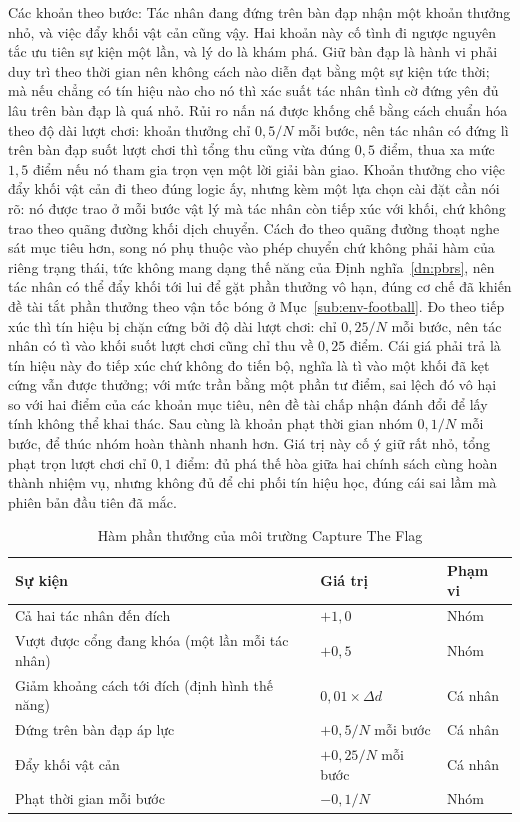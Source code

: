 \indent Các khoản theo bước: Tác nhân đang đứng trên bàn đạp nhận một khoản
thưởng nhỏ, và việc đẩy khối vật cản cũng vậy. Hai khoản này cố tình đi ngược nguyên tắc
ưu tiên sự kiện một lần, và lý do là khám phá. Giữ bàn đạp là hành vi phải duy trì theo
thời gian nên không cách nào diễn đạt bằng một sự kiện tức thời; mà nếu chẳng có tín hiệu
nào cho nó thì xác suất tác nhân tình cờ đứng yên đủ lâu trên bàn đạp là quá nhỏ. Rủi ro
nấn ná được khống chế bằng cách chuẩn hóa theo độ dài lượt chơi: khoản thưởng chỉ $0{,}5/N$
mỗi bước, nên tác nhân có đứng lì trên bàn đạp suốt lượt chơi thì tổng thu cũng vừa đúng
$0{,}5$ điểm, thua xa mức $1{,}5$ điểm nếu nó tham gia trọn vẹn một lời giải bàn giao.
Khoản thưởng cho việc đẩy khối vật cản đi theo đúng logic ấy, nhưng kèm một lựa chọn cài
đặt cần nói rõ: nó được trao ở mỗi bước vật lý mà tác nhân còn tiếp xúc với khối, chứ
không trao theo quãng đường khối dịch chuyển. Cách đo theo quãng đường thoạt nghe sát mục
tiêu hơn, song nó phụ thuộc vào phép chuyển chứ không phải hàm của riêng trạng thái, tức
không mang dạng thế năng của Định nghĩa~\ref{dn:pbrs}, nên tác nhân có thể đẩy khối tới
lui để gặt phần thưởng vô hạn, đúng cơ chế đã khiến đề tài tắt phần thưởng theo vận tốc
bóng ở Mục~\ref{sub:env-football}. Đo theo tiếp xúc thì tín hiệu bị chặn cứng bởi độ dài
lượt chơi: chỉ $0{,}25/N$ mỗi bước, nên tác nhân có tì vào khối suốt lượt chơi cũng chỉ
thu về $0{,}25$ điểm. Cái giá phải trả là tín hiệu này đo tiếp xúc chứ không đo tiến bộ,
nghĩa là tì vào một khối đã kẹt cứng vẫn được thưởng; với mức trần bằng một phần tư điểm,
sai lệch đó vô hại so với hai điểm của các khoản mục tiêu, nên đề tài chấp nhận đánh đổi
để lấy tính không thể khai thác.
Sau cùng là khoản phạt thời gian nhóm $0{,}1/N$ mỗi bước, để thúc nhóm hoàn thành nhanh
hơn. Giá trị này cố ý giữ rất nhỏ, tổng phạt trọn lượt chơi chỉ $0{,}1$ điểm: đủ phá thế
hòa giữa hai chính sách cùng hoàn thành nhiệm vụ, nhưng không đủ để chi phối tín hiệu học,
đúng cái sai lầm mà phiên bản đầu tiên đã mắc.

\begin{table}[H]
\centering
\caption{Hàm phần thưởng của môi trường Capture The Flag}
\label{tab:reward_capture}
\renewcommand{\arraystretch}{1.4}
\tablefont
\begin{tabular}{|p{7cm}|>{\centering\arraybackslash}p{3.4cm}|>{\centering\arraybackslash}p{2.8cm}|}
\hline
\textbf{Sự kiện} & \textbf{Giá trị} & \textbf{Phạm vi} \\
\hline
Cả hai tác nhân đến đích & $+1{,}0$ & Nhóm \\
\hline
Vượt được cổng đang khóa (một lần mỗi tác nhân) & $+0{,}5$ & Nhóm \\
\hline
Giảm khoảng cách tới đích (định hình thế năng) & $0{,}01 \times \Delta d$ & Cá nhân \\
\hline
Đứng trên bàn đạp áp lực & $+0{,}5/N$ mỗi bước & Cá nhân \\
\hline
Đẩy khối vật cản & $+0{,}25/N$ mỗi bước & Cá nhân \\
\hline
Phạt thời gian mỗi bước & $-0{,}1/N$ & Nhóm \\
\hline
\end{tabular}
\end{table}

